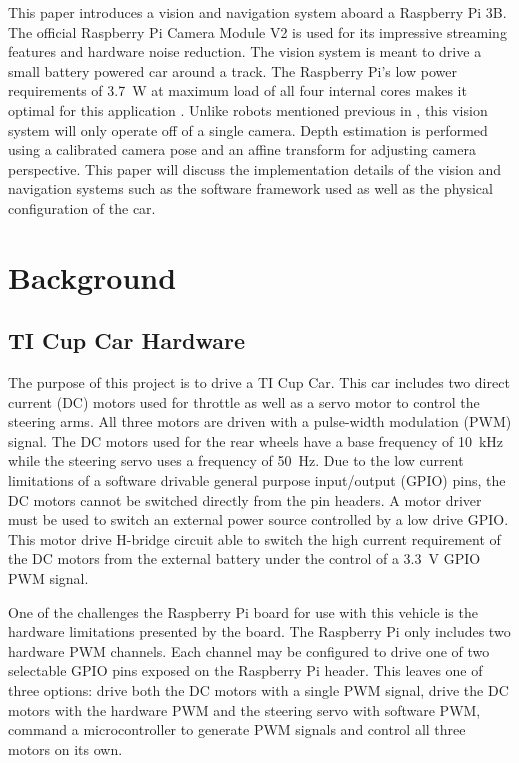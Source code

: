 \documentclass{article}
\begin{document}
This paper introduces a vision and navigation system aboard a Raspberry Pi 3B. The official
Raspberry Pi Camera Module V2 is used for its impressive streaming features and hardware
noise reduction. The vision system is meant to drive a small battery powered car around
a track. The Raspberry Pi's low power requirements of \SI{3.7}{\watt} at maximum load
of all four internal cores makes it optimal for this application \cite{b2}. Unlike
robots mentioned previous in \cite{b1}, this vision system will only operate off of
a single camera. Depth estimation is performed using a calibrated camera pose and an
affine transform for adjusting camera perspective. This paper will discuss the
implementation details of the vision and navigation systems such as the software framework
used as well as the physical configuration of the car. 

\section{Background}

\subsection{TI Cup Car Hardware}

The purpose of this project is to drive a TI Cup Car. This car includes two direct current
(DC) motors used for throttle as well as a servo motor to control the steering arms.
All three motors are driven with a pulse-width modulation (PWM) signal. The DC motors
used for the rear wheels have a base frequency of \SI{10}{\kilo\hertz} while the steering
servo uses a frequency of \SI{50}{\hertz}. Due to the low current limitations of a software
drivable general purpose input/output (GPIO) pins, the DC motors cannot be switched directly
from the pin headers. A motor driver must be used to switch an external power source
controlled by a low drive GPIO. This motor drive H-bridge circuit able to
switch the high current requirement of the DC motors from the external battery under the
control of a \SI{3.3}{\volt} GPIO PWM signal.

One of the challenges the Raspberry Pi board for use with this vehicle is the hardware
limitations presented by the board. The Raspberry Pi only includes two hardware PWM
channels. Each channel may be configured to drive one of two selectable GPIO pins
exposed on the Raspberry Pi header. This leaves one of three options: drive both the
DC motors with a single PWM signal, drive the DC motors with the hardware PWM and the
steering servo with software PWM, command a microcontroller to generate PWM signals
and control all three motors on its own.
\end{document}
